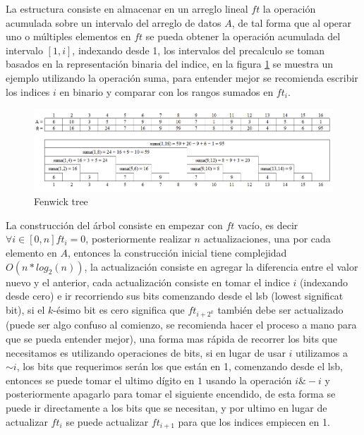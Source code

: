 \documentclass[12pt, a4paper]{article}
\begin{document}
	La estructura consiste en almacenar en un arreglo lineal $ft$ la operación acumulada sobre un intervalo del 
	arreglo de datos $A$, de tal forma que al operar uno o múltiples elementos en $ft$ se pueda obtener la operación  
	acumulada del intervalo $[1,i]$, indexando desde 1, los intervalos del precalculo se toman basados en la  
	representación binaria del indice, en la figura \ref{estructuras:fenwick_tree:ejemplo} se muestra un ejemplo  
	utilizando la operación suma, para entender mejor se recomienda escribir los indices $i$ en binario y comparar con 
	los rangos sumados en $ft_{i}$.\\
	
	\begin{figure}[!htb]
		\centering
		\includegraphics[scale=0.675]{Estructuras_de_datos/imagenes/fenwick_tree/ejemplo}
		\caption{Fenwick tree}
		\label{estructuras:fenwick_tree:ejemplo}
	\end{figure}
	
	La construcción del árbol consiste en empezar con $ft$ vacío, es decir $\forall i \in [0,n] ft_{i} = 0$, 
	posteriormente realizar $n$ actualizaciones, una por cada elemento en $A$, entonces la construcción inicial tiene
	complejidad $O(n * log_{2}(n))$, la actualización consiste en agregar la diferencia entre el valor nuevo y el 
	anterior, cada actualización consiste en tomar el indice $i$ (indexando desde cero) e ir recorriendo sus bits
	comenzando desde el lsb (lowest significat bit), si el $k$-ésimo bit es cero significa que $ft_{i+2^{k}}$ también  
	debe ser actualizado (puede ser algo confuso al comienzo, se recomienda hacer el proceso a mano para que se pueda  
	entender mejor), una forma mas rápida de recorrer los bits que necesitamos es utilizando operaciones de bits, si en  
	lugar de usar $i$ utilizamos a $\sim i$, los bits que requerimos serán los que están en 1, comenzando desde el lsb, 
	entonces se puede tomar el ultimo dígito en $1$ usando la operación $i \& -i$ y posteriormente apagarlo para 
	tomar el siguiente encendido, de esta forma se puede ir directamente a los bits que se necesitan, y por ultimo en 
	lugar de actualizar $ft_{i}$ se puede actualizar $ft_{i+1}$ para que los indices empiecen en 1.\\
	
\end{document}
